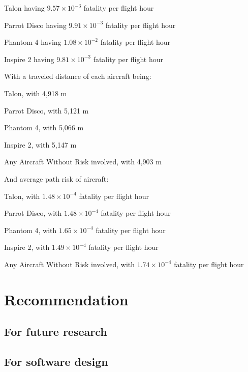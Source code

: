 \documentclass[12pt]{report}
\begin{document}
    \begin{myitemize}
        \item Talon having $9.57 \times 10^{-3}$ fatality per flight hour
        \item Parrot Disco having $9.91 \times 10^{-3}$ fatality per flight hour
        \item Phantom 4 having $1.08 \times 10^{-2}$ fatality per flight hour
        \item Inspire 2 having $9.81 \times 10^{-3}$ fatality per flight hour
    \end{myitemize}
    With a traveled distance of each aircraft being:
    \begin{myitemize}
        \item Talon, with 4,918 m
        \item Parrot Disco, with 5,121 m
        \item Phantom 4, with 5,066 m
        \item Inspire 2, with 5,147 m
        \item Any Aircraft Without Risk involved, with 4,903 m
    \end{myitemize}
    And average path risk of aircraft:
    \begin{myitemize}
        \item Talon, with $1.48 \times 10^{-4}$ fatality per flight hour
        \item Parrot Disco, with $1.48 \times 10^{-4}$ fatality per flight hour
        \item Phantom 4, with $1.65 \times 10^{-4}$ fatality per flight hour
        \item Inspire 2, with $1.49 \times 10^{-4}$ fatality per flight hour
        \item Any Aircraft Without Risk involved, with $1.74 \times 10^{-4}$ fatality per flight hour
    \end{myitemize}

    \section{Recommendation}
        \subsection{For future research}
        \subsection{For software design}

\printbibliography
\end{document}
